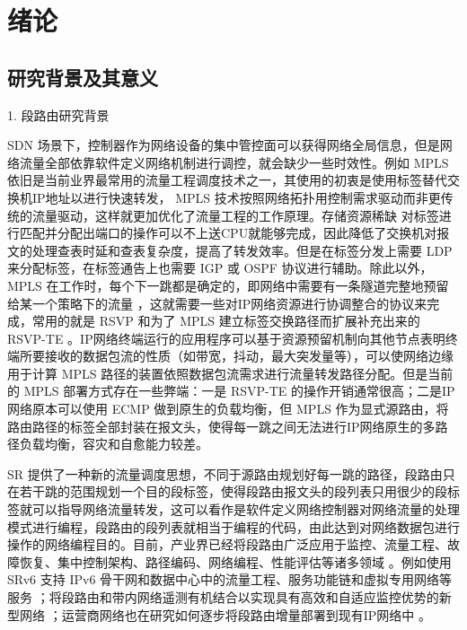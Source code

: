 
\chapter{绪论}
\section{研究背景及其意义}

1. 段路由研究背景

\gls*{SDN} \cite{OPENFLOW, SDN} 场景下，控制器作为网络设备的集中管控面可以获得网络全局信息，但是网络流量全部依靠软件定义网络机制进行调控，就会缺少一些时效性。例如 \gls*{MPLS} 依旧是当前业界最常用的流量工程调度技术之一，其使用的初衷是使用标签替代交换机IP地址以进行快速转发， \gls*{MPLS} \cite{MPLS} 技术按照网络拓扑用控制需求驱动而非更传统的流量驱动，这样就更加优化了流量工程的工作原理。存储资源稀缺 \cite{TCAMMPLS, TCAMSDN} 对标签进行匹配并分配出端口的操作可以不上送CPU就能够完成，因此降低了交换机对报文的处理查表时延和查表复杂度，提高了转发效率。但是在标签分发上需要 \gls*{LDP} 来分配标签，在标签通告上也需要 \gls*{IGP} 或 \gls*{OSPF} 协议进行辅助。除此以外， \gls*{MPLS} 在工作时，每个下一跳都是确定的，即网络中需要有一条隧道完整地预留给某一个策略下的流量 \cite{MPLS} ，这就需要一些对IP网络资源进行协调整合的协议来完成，常用的就是 \gls*{RSVP} \cite{RSVP} 和为了 \gls*{MPLS} 建立标签交换路径而扩展补充出来的 \gls*{RSVP-TE} 。IP网络终端运行的应用程序可以基于资源预留机制向其他节点表明终端所要接收的数据包流的性质（如带宽，抖动，最大突发量等），可以使网络边缘用于计算 \gls*{MPLS} 路径的装置依照数据包流需求进行流量转发路径分配。但是当前的 \gls*{MPLS} 部署方式存在一些弊端：一是 \gls*{RSVP-TE} 的操作开销通常很高；二是IP网络原本可以使用 \gls*{ECMP} 做到原生的负载均衡，但 \gls*{MPLS} 作为显式源路由，将路由路径的标签全部封装在报文头，使得每一跳之间无法进行IP网络原生的多路径负载均衡，容灾和自愈能力较差。

\gls*{SR} \cite*{SRARK} 提供了一种新的流量调度思想，不同于源路由规划好每一跳的路径，段路由只在若干跳的范围规划一个目的段标签，使得段路由报文头的段列表只用很少的段标签就可以指导网络流量转发，这可以看作是软件定义网络控制器对网络流量的处理模式进行编程，段路由的段列表就相当于编程的代码，由此达到对网络数据包进行操作的网络编程目的。目前，产业界已经将段路由广泛应用于监控、流量工程、故障恢复、集中控制架构、路径编码、网络编程、性能评估等诸多领域 \cite{SRSURVEYS}。例如使用 \gls*{SRv6} 支持 IPv6 骨干网和数据中心中的流量工程、服务功能链和虚拟专用网络等服务 \cite{SRUSAGE1, SRUSAGE2}；将段路由和带内网络遥测有机结合以实现具有高效和自适应监控优势的新型网络 \cite{SRUSAGE3}；运营商网络也在研究如何逐步将段路由增量部署到现有IP网络中 \cite{SRBANDWIDTH7}。


